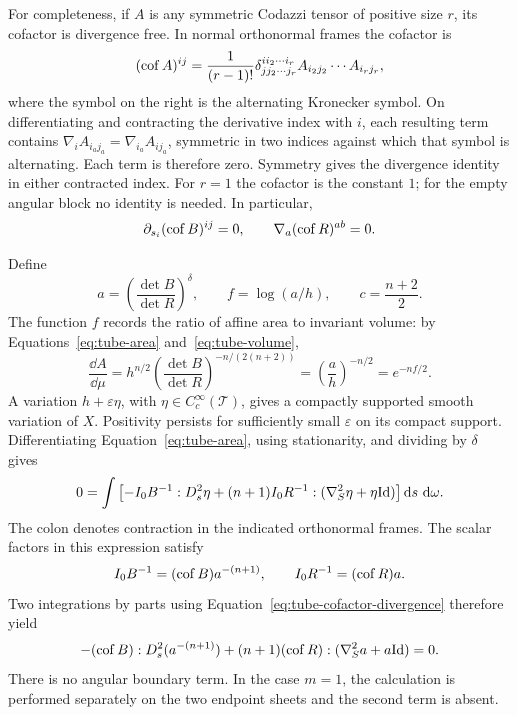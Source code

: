 For completeness, if $A$ is any symmetric Codazzi tensor of positive
size $r$, its cofactor is divergence free.  In normal orthonormal
frames the cofactor is
\[
 (\operatorname{cof} A)^{ij}
 =\frac{1}{(r-1)!}
   \delta^{i i_2\cdots i_r}_{j j_2\cdots j_r}
   A_{i_2j_2}\cdots A_{i_rj_r},
\]
where the symbol on the right is the alternating Kronecker symbol.
On differentiating and contracting the derivative index with $i$,
each resulting term contains
$\nabla_iA_{i_a j_a}=\nabla_{i_a}A_{i j_a}$, symmetric in two indices
against which that symbol is alternating.  Each term is therefore
zero.  Symmetry gives the divergence identity in either contracted
index.  For $r=1$ the cofactor is the constant $1$; for the empty
angular block no identity is needed.  In particular,
\begin{equation}\label{eq:tube-cofactor-divergence}
 \partial_{s_i}(\operatorname{cof} B)^{ij}=0,
 \qquad \nabla_a(\operatorname{cof} R)^{ab}=0.
\end{equation}

Define
\begin{equation}\label{eq:tube-af-definitions}
 a=\left(\frac{\det B}{\det R}\right)^\delta,
 \qquad f=\log(a/h),
 \qquad c=\frac{n+2}{2}.
\end{equation}
The function $f$ records the ratio of affine area to invariant volume:
by Equations~\eqref{eq:tube-area} and~\eqref{eq:tube-volume},
\[
 \frac{\dd A}{\dd\mu}
 =h^{n/2}\left(\frac{\det B}{\det R}\right)^{-n/(2(n+2))}
 =\left(\frac ah\right)^{-n/2}=e^{-nf/2}.
\]
A variation $h+\varepsilon\eta$, with
$\eta\in C_c^\infty(\mathcal T)$, gives a compactly supported smooth
variation of $X$.  Positivity persists for sufficiently small
$\varepsilon$ on its compact support.  Differentiating
Equation~\eqref{eq:tube-area}, using stationarity, and dividing by
$\delta$ gives
\[
 0=\int\left[
 -I_0 B^{-1}:D_s^2\eta
 +(n+1)I_0 R^{-1}:(\nabla_S^2\eta+\eta\mathrm{Id})
 \right]\mathop{}\!\mathrm d s\,\mathop{}\!\mathrm d\omega.
\]
The colon denotes contraction in the indicated orthonormal frames.
The scalar factors in this expression satisfy
\[
 I_0B^{-1}=(\operatorname{cof} B)a^{-(n+1)},
 \qquad I_0R^{-1}=(\operatorname{cof} R)a.
\]
Two integrations by parts using
Equation~\eqref{eq:tube-cofactor-divergence} therefore yield
\begin{equation}\label{eq:tube-euler}
 -(\operatorname{cof} B):D_s^2(a^{-(n+1)})
 +(n+1)(\operatorname{cof} R):(\nabla_S^2a+a\mathrm{Id})=0.
\end{equation}
There is no angular boundary term.  In the case $m=1$, the calculation
is performed separately on the two endpoint sheets and the second
term is absent.

